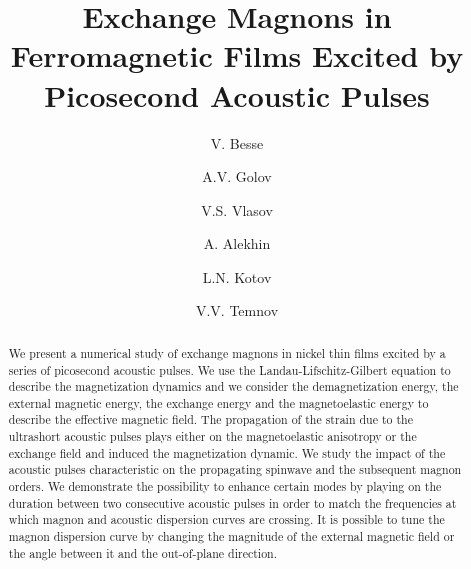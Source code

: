 \documentclass[%
superscriptaddress,
preprint,
showpacs,
amsmath,
amssymb,
aps,
prl,
]{revtex4-1}
\begin{document}
	
\title{Exchange Magnons in Ferromagnetic Films Excited by Picosecond Acoustic Pulses}
	
\author{V. Besse}
\author{A.V. Golov}
\author{V.S. Vlasov}
\author{A. Alekhin}
\author{L.N. Kotov}
\author{V.V. Temnov}
	
\begin{abstract}
We present a numerical study of exchange magnons in nickel thin films excited by a series of picosecond acoustic pulses.
We use the Landau-Lifschitz-Gilbert equation to describe the magnetization dynamics and we consider the demagnetization energy, the external magnetic energy, the exchange energy and the magnetoelastic energy to describe the effective magnetic field.
The propagation of the strain due to the ultrashort acoustic pulses plays either on the magnetoelastic anisotropy or the exchange field and induced the magnetization dynamic.
We study the impact of the acoustic pulses characteristic on the propagating spinwave and the subsequent magnon orders.
We demonstrate the possibility to enhance certain modes by playing on the duration between two consecutive acoustic pulses in order to match the frequencies at which magnon and acoustic dispersion curves are crossing.
It is possible to tune the magnon dispersion curve by changing the magnitude of the external magnetic field or the angle between it and the out-of-plane direction.
\end{abstract}
	
\maketitle
	
\end{document}
